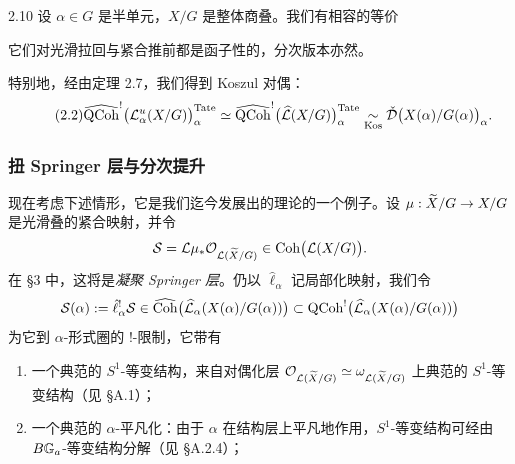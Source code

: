 \begin{thm}{2.10}\label{thm:a5-02-5}
设 $\alpha\in G$ 是半单元，$X/G$ 是整体商叠。我们有相容的等价
\begin{center}
\end{center}
它们对光滑拉回与紧合推前都是函子性的，分次版本亦然。

特别地，经由定理 2.7，我们得到 Koszul 对偶：
\begin{equation}
\tag{2.2}\label{eq:a5-02-2}
\widehat{\operatorname{QCoh}}^!\bigl(\mathcal{L}^u_\alpha(X/G)\bigr)^{\mathrm{Tate}}_\alpha
\simeq\widehat{\operatorname{QCoh}}^!\bigl(\widehat{\mathcal{L}}(X/G)\bigr)^{\mathrm{Tate}}_\alpha
\underset{\mathrm{Kos}}{\sim}\check{\mathcal{D}}\bigl(X(\alpha)/G(\alpha)\bigr)_\alpha.
\end{equation}
\end{thm}

\subsubsection{扭 Springer 层与分次提升}
现在考虑下述情形，它是我们迄今发展出的理论的一个例子。设 $\mu:\widetilde X/G\to X/G$ 是光滑叠的紧合映射，并令
\[
\mathcal S=\mathcal{L}\mu_*\mathcal{O}_{\mathcal{L}(\widetilde X/G)}\in\operatorname{Coh}\bigl(\mathcal{L}(X/G)\bigr).
\]
在 §3 中，这将是\emph{凝聚 Springer 层}。仍以 $\hat\ell_\alpha$ 记局部化映射，我们令
\[
\mathcal S(\alpha):=\hat\ell^!_\alpha\mathcal S\in\widehat{\operatorname{Coh}}\bigl(\widehat{\mathcal{L}}_\alpha(X(\alpha)/G(\alpha))\bigr)\subset\operatorname{QCoh}^!\bigl(\widehat{\mathcal{L}}_\alpha(X(\alpha)/G(\alpha))\bigr)
\]
为它到 $\alpha$-形式圈的 !-限制，它带有

\begin{enumerate}[label=(\arabic*),leftmargin=2.6em,itemsep=0.2em]
\item 一个典范的 $S^1$-等变结构，来自对偶化层 $\mathcal{O}_{\mathcal{L}(\widetilde X/G)}\simeq\omega_{\mathcal{L}(\widetilde X/G)}$ 上典范的 $S^1$-等变结构（见 §A.1）；
\item 一个典范的 $\alpha$-平凡化：由于 $\alpha$ 在结构层上平凡地作用，$S^1$-等变结构可经由 $B\mathbb{G}_a$-等变结构分解（见 §A.2.4）；
\end{enumerate}

